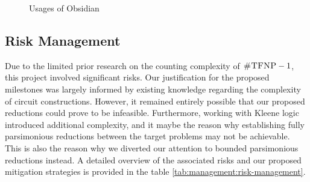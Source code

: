 \begin{figure}[h!]
    \centering
    \caption{Usages of Obsidian}
    \label{fig:theory:obsidian-usages}
\end{figure}



\subsection{Risk Management}

Due to the limited prior research on the counting complexity of $\textsc{\#TFNP} -1$,
this project involved significant risks.
Our justification for the proposed milestones was largely informed by existing knowledge regarding the complexity of circuit constructions.
However, it remained entirely possible that our proposed reductions could prove to be infeasible.
Furthermore, working with Kleene logic introduced additional complexity, and it maybe the reason why 
establishing fully parsimonious reductions between the target problems may not be achievable.
This is also the reason why we diverted our attention to bounded parsimonious reductions instead.
A detailed overview of the associated risks and our proposed mitigation strategies is provided in the table \ref{tab:management:risk-management}.



